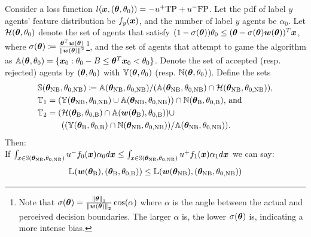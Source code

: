 \begin{proposition}\label{prop:mismatch-actual-b} 
    Consider a loss function $l({\bm{x}}, ({\bm{\theta}}, \theta_0))=-u^+\text{TP}+u^-\text{FP}$. Let the pdf of label $y$ agents' feature distribution be $f_y({\bm{x}})$, and the number of label $y$ agents be $\alpha_0$. Let $\mathcal{H}({\bm{\theta}}, \theta_0)$ denote the set of agents that satisfy $(1-\sigma({\bm{\theta}}))\theta_0\le({\bm{\theta}}-\sigma({\bm{\theta}}){\bm{w}}({\bm{\theta}}))^T{\bm{x}}$, where $\sigma({\bm{\theta}}) \coloneqq \frac{{\bm{\theta}}^T{\bm{w}}({\bm{\theta}})}{\norm{{\bm{w}}({\bm{\theta}})}^2}$\footnote{Note that $\sigma({\bm{\theta}})=\frac{\norm{{\bm{\theta}}}_2}{\norm{{\bm{w}}({\bm{\theta}})}_2}\cos(\alpha)$ where $\alpha$ is the angle between the actual and perceived decision boundaries. The larger $\alpha$ is, the lower $\sigma({\bm{\theta}})$ is, indicating a more intense bias.}, and the set of agents that attempt to game the algorithm as ${\mathbb{A}}({\bm{\theta}}, \theta_0) = \{{\bm{x}}_0: \theta_0 - B \le {\bm{\theta}}^T{\bm{x}}_0 < \theta_0 \}$. Denote the set of accepted (resp. rejected) agents by $({\bm{\theta}}, \theta_0)$ with ${\mathbb{Y}}({\bm{\theta}}, \theta_0)$ (resp. ${\mathbb{N}}({\bm{\theta}}, \theta_0)$). Define the sets 
    \begin{align*}        
        &{\mathbb{S}}({\bm{\theta}}_\text{NB}, \theta_{0, \text{NB}}) \coloneqq {\mathbb{A}}({\bm{\theta}}_\text{NB}, \theta_{0, \text{NB}})/({\mathbb{A}}({\bm{\theta}}_\text{NB}, \theta_{0, \text{NB}})\cap\mathcal{H}({\bm{\theta}}_\text{NB}, \theta_{0, \text{NB}})), \\
        &{\mathbb{T}}_1=({\mathbb{Y}}({\bm{\theta}}_\text{NB}, \theta_{0,\text{NB}})\cup {\mathbb{A}}({\bm{\theta}}_\text{NB}, \theta_{0,\text{NB}}))\cap {\mathbb{N}}({\bm{\theta}}_\text{B}, \theta_{0,\text{B}})\text{, and} \\
        &{\mathbb{T}}_2 = (\mathcal{H}({\bm{\theta}}_\text{B}, \theta_{0,\text{B}})\cap {\mathbb{A}}({\bm{w}}({\bm{\theta}}_\text{B}), \theta_{0,\text{B}}))\cup \\
        &\hspace{1cm}(({\mathbb{Y}}({\bm{\theta}}_\text{B}, \theta_{0,\text{B}}) \cap {\mathbb{N}}({\bm{\theta}}_\text{NB}, \theta_{0,\text{NB}}))/{\mathbb{A}}({\bm{\theta}}_\text{NB}, \theta_{0,\text{NB}})).
    \end{align*}
    Then:\\[2pt]
     If $\int_{x\in {\mathbb{S}}({\bm{\theta}}_\text{NB}, \theta_{0, \text{NB}})} u^- f_0({\bm{x}})\alpha_0 d{\bm{x}} \le \int_{x\in {\mathbb{S}}({\bm{\theta}}_\text{NB}, \theta_{0, \text{NB}})} u^+ f_1({\bm{x}})\alpha_1 d{\bm{x}} $ we can say: 
    \begin{align}\label{eq:firm-loss-comp-benefit}
        \sL(\vw(\vtheta_\text{B}), (\vtheta_\text{B}, \theta_{0, \text{B}}))&\le \sL(\vw(\vtheta_\text{NB}), (\vtheta_\text{NB}, \theta_{0, \text{NB}}))\notag \\

\end{align}
\end{proposition}

